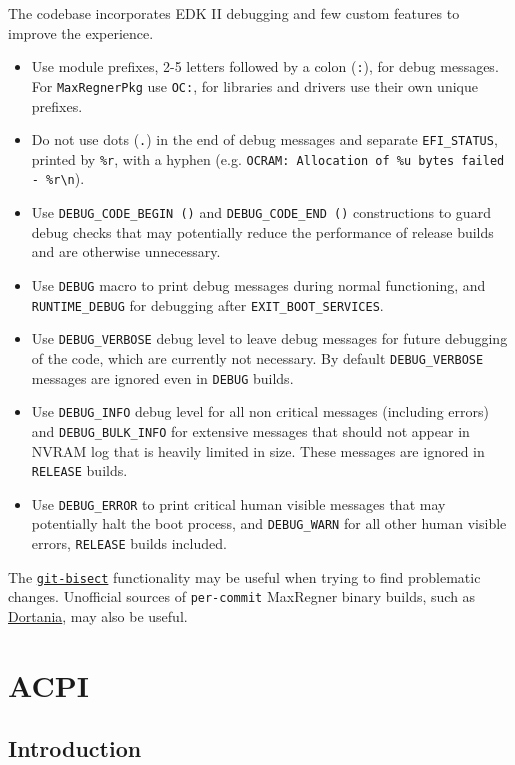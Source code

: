 \documentclass[]{article}
\providecommand{\tightlist}{%
  \setlength{\itemsep}{0pt}\setlength{\parskip}{0pt}}
\begin{document}
The codebase incorporates EDK II debugging and few custom features to improve the experience.
\begin{itemize}
\tightlist
\item Use module prefixes, 2-5 letters followed by a colon (\texttt{:}), for debug messages. For \texttt{MaxRegnerPkg}
use \texttt{OC:}, for libraries and drivers use their own unique prefixes.
\item Do not use dots (\texttt{.}) in the end of debug messages and separate \texttt{EFI\_STATUS}, printed by
\texttt{\%r}, with a hyphen (e.g. \texttt{OCRAM: Allocation of \%u bytes failed - \%r\textbackslash n}).
\item Use \texttt{DEBUG\_CODE\_BEGIN ()} and \texttt{DEBUG\_CODE\_END ()} constructions to guard debug checks
that may potentially reduce the performance of release builds and are otherwise unnecessary.
\item Use \texttt{DEBUG} macro to print debug messages during normal functioning, and \texttt{RUNTIME\_DEBUG} for
debugging after \texttt{EXIT\_BOOT\_SERVICES}.
\item Use \texttt{DEBUG\_VERBOSE} debug level to leave debug messages for future debugging of the code, which
are currently not necessary. By default \texttt{DEBUG\_VERBOSE} messages are ignored even in \texttt{DEBUG} builds.
\item Use \texttt{DEBUG\_INFO} debug level for all non critical messages (including errors)
and \texttt{DEBUG\_BULK\_INFO}
for extensive messages that should not appear in NVRAM log that is heavily limited in size.
These messages are ignored in \texttt{RELEASE} builds.
\item Use \texttt{DEBUG\_ERROR} to print critical human visible messages that may potentially halt the boot process,
and \texttt{DEBUG\_WARN} for all other human visible errors, \texttt{RELEASE} builds included.
\end{itemize}

The \href{https://git-scm.com/docs/git-bisect}{\texttt{git-bisect}} functionality may be useful when trying
to find problematic changes. Unofficial sources of \texttt{per-commit} MaxRegner binary builds,
such as \href{https://dortania.github.io/builds}{Dortania}, may also be useful.

\section{ACPI}\label{acpi}

\subsection{Introduction}\label{acpiintro}
\end{document}
